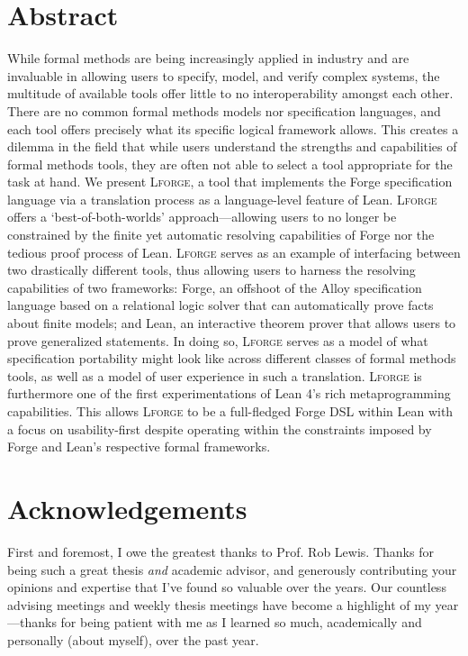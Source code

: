 \newpage
\section*{Abstract}
While formal methods are being increasingly applied in industry and are invaluable in allowing users to specify, model, and verify complex systems, the multitude of available tools offer little to no interoperability amongst each other. 
There are no common formal methods models nor specification languages, and each tool offers precisely what its specific logical framework allows. 
This creates a dilemma in the field that while users understand the strengths and capabilities of formal methods tools, they are often not able to select a tool appropriate for the task at hand. 
We present \textsc{Lforge}, a tool that implements the Forge specification language via a translation process as a language-level feature of Lean. 
\textsc{Lforge} offers a `best-of-both-worlds' approach---allowing users to no longer be constrained by the finite yet automatic resolving capabilities of Forge nor the tedious proof process of Lean.
\textsc{Lforge} serves as an example of interfacing between two drastically different tools, thus allowing users to harness the resolving capabilities of two frameworks: Forge, an offshoot of the Alloy specification language based on a relational logic solver that can automatically prove facts about finite models; and Lean, an interactive theorem prover that allows users to prove generalized statements. 
In doing so, \textsc{Lforge} serves as a model of what specification portability might look like across different classes of formal methods tools, as well as a model of user experience in such a translation. 
\textsc{Lforge} is furthermore one of the first experimentations of Lean 4's rich metaprogramming capabilities. This allows \textsc{Lforge} to be a full-fledged Forge DSL within Lean with a focus on usability-first despite operating within the constraints imposed by Forge and Lean's respective formal frameworks. 

\newpage
\section*{Acknowledgements}

First and foremost, I owe the greatest thanks to Prof. Rob Lewis. Thanks for being such a great thesis \emph{and} academic advisor, and generously contributing your opinions and expertise that I've found so valuable over the years. Our countless advising meetings and weekly thesis meetings have become a highlight of my year---thanks for being patient with me as I learned so much, academically and personally (about myself), over the past year. 

